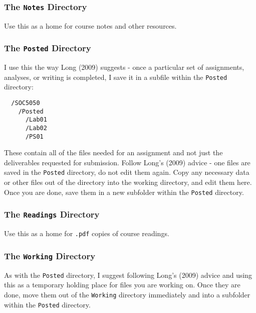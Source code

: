 \documentclass[]{book}
\begin{document}
\subsubsection{\texorpdfstring{The \texttt{Notes}
Directory}{The Notes Directory}}\label{the-notes-directory}

Use this as a home for course notes and other resources.

\subsubsection{\texorpdfstring{The \texttt{Posted}
Directory}{The Posted Directory}}\label{the-posted-directory}

I use this the way Long (2009) suggests - once a particular set of
assignments, analyses, or writing is completed, I save it in a subfile
within the \texttt{Posted} directory:

\begin{verbatim}
  /SOC5050
    /Posted
      /Lab01
      /Lab02
      /PS01
\end{verbatim}

These contain all of the files needed for an assignment and not just the
deliverables requested for submission. Follow Long's (2009) advice - one
files are saved in the \texttt{Posted} directory, do not edit them
again. Copy any necessary data or other files out of the directory into
the working directory, and edit them here. Once you are done, save them
in a new subfolder within the \texttt{Posted} directory.

\subsubsection{\texorpdfstring{The \texttt{Readings}
Directory}{The Readings Directory}}\label{the-readings-directory}

Use this as a home for \texttt{.pdf} copies of course readings.

\subsubsection{\texorpdfstring{The \texttt{Working}
Directory}{The Working Directory}}\label{the-working-directory}

As with the \texttt{Posted} directory, I suggest following Long's (2009)
advice and using this as a temporary holding place for files you are
working on. Once they are done, move them out of the \texttt{Working}
directory immediately and into a subfolder within the \texttt{Posted}
directory.
\end{document}
